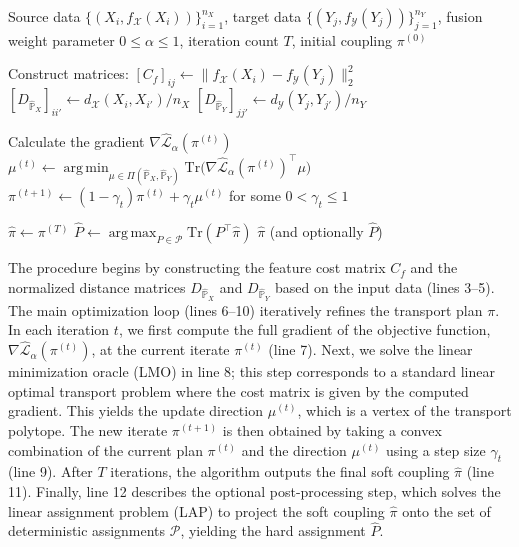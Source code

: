 \documentclass{article}
\theoremstyle{plain}
\theoremstyle{definition}
\theoremstyle{remark}
\DeclareMathOperator*{\argmin}{arg\,min}
\DeclareMathOperator*{\argmax}{arg\,max}
\begin{document}
\begin{algorithm}[t]
	\caption{Convex Distance Operator Transport Plan via FW and Optional LAP}
	\label{alg:proposed-algorithm}
	\begin{algorithmic}[1]
		 Source data $\{(X_i, f_{\mathcal{X}}(X_i))\}_{i=1}^{n_X}$, target data $\{(Y_j, f_{\mathcal{Y}}(Y_j))\}_{j=1}^{n_Y}$, fusion weight parameter $0 \leq \alpha \leq 1$, iteration count $T$, initial coupling $\pi^{(0)}$
		
		\STATE Construct matrices:
		\STATE $[C_f]_{ij} \gets \|f_{\mathcal{X}}(X_i)-f_{\mathcal{Y}}(Y_j)\|_2^2$
		\STATE $[D_{\hat{\mathbb{P}}_X}]_{ii'} \gets d_{\mathcal{X}}(X_i,X_{i'})/n_X$
		\STATE $[D_{\hat{\mathbb{P}}_Y}]_{jj'} \gets d_{\mathcal{Y}}(Y_j,Y_{j'})/n_Y$
		
		\STATE Calculate the gradient $\nabla \hat{\mathcal{L}}_{\alpha}(\pi^{(t)})$
		\STATE $\mu^{(t)} \gets \argmin_{\mu \in \Pi(\hat{\mathbb{P}}_X,\hat{\mathbb{P}}_Y)} \mathrm{Tr}\big(\nabla \hat{\mathcal{L}}_{\alpha}(\pi^{(t)})^\top \mu\big)$
		\STATE $\pi^{(t+1)} \gets (1-\gamma_t)\pi^{(t)} + \gamma_t \mu^{(t)}$ for some $0 < \gamma_t \leq 1$
		\ENDFOR
		
		\STATE $\hat\pi \gets \pi^{(T)}$
		 $\hat{P} \gets \argmax_{P \in \mathcal{P}} \mathrm{Tr}(P^\top \hat\pi)$
		 $\hat\pi$ (and optionally $\hat{P}$)
	\end{algorithmic}
\end{algorithm}

The procedure begins by constructing the feature cost matrix $C_f$ and the normalized distance matrices $D_{\hat{\mathbb{P}}_X}$ and $D_{\hat{\mathbb{P}}_Y}$ based on the input data (lines 3--5). The main optimization loop (lines 6--10) iteratively refines the transport plan $\pi$. In each iteration $t$, we first compute the full gradient of the objective function, $\nabla \hat{\mathcal{L}}_{\alpha}(\pi^{(t)})$, at the current iterate $\pi^{(t)}$ (line 7). Next, we solve the linear minimization oracle (LMO) in line 8; this step corresponds to a standard linear optimal transport problem where the cost matrix is given by the computed gradient. This yields the update direction $\mu^{(t)}$, which is a vertex of the transport polytope. The new iterate $\pi^{(t+1)}$ is then obtained by taking a convex combination of the current plan $\pi^{(t)}$ and the direction $\mu^{(t)}$ using a step size $\gamma_t$ (line 9). After $T$ iterations, the algorithm outputs the final soft coupling $\hat{\pi}$ (line 11). Finally, line 12 describes the optional post-processing step, which solves the linear assignment problem (LAP) to project the soft coupling $\hat{\pi}$ onto the set of deterministic assignments $\mathcal{P}$, yielding the hard assignment $\hat{P}$.
\end{document}
